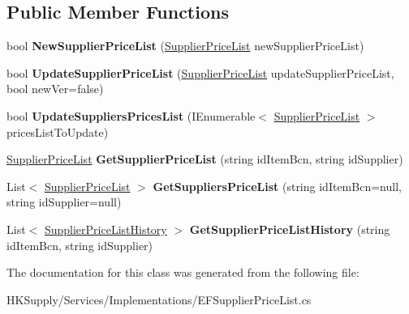 \subsection*{Public Member Functions}
\begin{DoxyCompactItemize}
\item 
\mbox{\label{class_h_k_supply_1_1_services_1_1_implementations_1_1_e_f_supplier_price_list_a7ffdeda9be6ccb89e5a66f9302354c36}} 
bool {\bfseries New\+Supplier\+Price\+List} (\mbox{\hyperlink{class_h_k_supply_1_1_models_1_1_supplier_price_list}{Supplier\+Price\+List}} new\+Supplier\+Price\+List)
\item 
\mbox{\label{class_h_k_supply_1_1_services_1_1_implementations_1_1_e_f_supplier_price_list_a8c2a1e9286648f464db23fd2569cba7f}} 
bool {\bfseries Update\+Supplier\+Price\+List} (\mbox{\hyperlink{class_h_k_supply_1_1_models_1_1_supplier_price_list}{Supplier\+Price\+List}} update\+Supplier\+Price\+List, bool new\+Ver=false)
\item 
\mbox{\label{class_h_k_supply_1_1_services_1_1_implementations_1_1_e_f_supplier_price_list_a0a4ad00099dda143bf391fbd182071b5}} 
bool {\bfseries Update\+Suppliers\+Prices\+List} (I\+Enumerable$<$ \mbox{\hyperlink{class_h_k_supply_1_1_models_1_1_supplier_price_list}{Supplier\+Price\+List}} $>$ prices\+List\+To\+Update)
\item 
\mbox{\label{class_h_k_supply_1_1_services_1_1_implementations_1_1_e_f_supplier_price_list_a573b81b54f0ea34e3b661a8dbf94384b}} 
\mbox{\hyperlink{class_h_k_supply_1_1_models_1_1_supplier_price_list}{Supplier\+Price\+List}} {\bfseries Get\+Supplier\+Price\+List} (string id\+Item\+Bcn, string id\+Supplier)
\item 
\mbox{\label{class_h_k_supply_1_1_services_1_1_implementations_1_1_e_f_supplier_price_list_a470196eba9fff7dce929eea916f380cf}} 
List$<$ \mbox{\hyperlink{class_h_k_supply_1_1_models_1_1_supplier_price_list}{Supplier\+Price\+List}} $>$ {\bfseries Get\+Suppliers\+Price\+List} (string id\+Item\+Bcn=null, string id\+Supplier=null)
\item 
\mbox{\label{class_h_k_supply_1_1_services_1_1_implementations_1_1_e_f_supplier_price_list_afdc00acf0b987fd15641cf3ce99c5173}} 
List$<$ \mbox{\hyperlink{class_h_k_supply_1_1_models_1_1_supplier_price_list_history}{Supplier\+Price\+List\+History}} $>$ {\bfseries Get\+Supplier\+Price\+List\+History} (string id\+Item\+Bcn, string id\+Supplier)
\end{DoxyCompactItemize}


The documentation for this class was generated from the following file\+:\begin{DoxyCompactItemize}
\item 
H\+K\+Supply/\+Services/\+Implementations/E\+F\+Supplier\+Price\+List.\+cs\end{DoxyCompactItemize}
